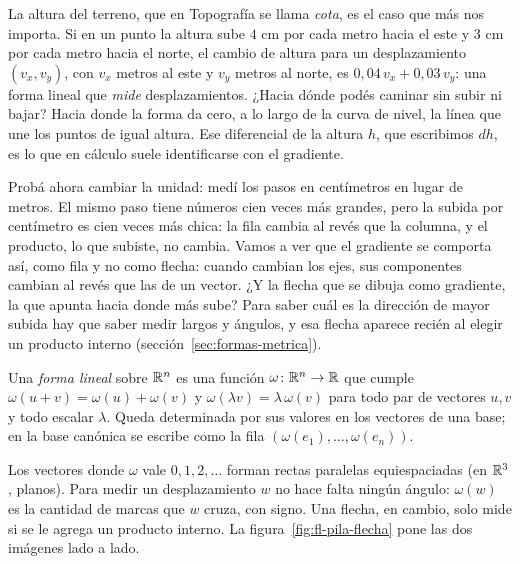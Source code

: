 La altura del terreno, que en Topografía se llama \emph{cota}, es el caso que más nos importa.
Si en un punto la altura sube \(4\) cm por cada metro hacia el este y \(3\) cm por cada metro
hacia el norte, el cambio de altura para un desplazamiento \((v_x,v_y)\), con \(v_x\) metros
al este y \(v_y\) metros al norte, es \(0{,}04\,v_x+0{,}03\,v_y\): una forma lineal que
\emph{mide} desplazamientos. ¿Hacia dónde podés caminar sin subir ni bajar? Hacia donde la
forma da cero, a lo largo de la curva de nivel, la línea que une los puntos de igual altura. Ese diferencial de la altura \(h\), que
escribimos \(dh\), es lo que en cálculo suele identificarse con el gradiente.

Probá ahora cambiar la unidad: medí los pasos en centímetros en lugar de metros. El mismo paso
tiene números cien veces más grandes, pero la subida por centímetro es cien veces más chica:
la fila cambia al revés que la columna, y el producto, lo que subiste, no cambia. Vamos a ver
que el gradiente se comporta así, como fila y no como flecha: cuando cambian los ejes, sus
componentes cambian al revés que las de un vector. ¿Y la flecha que se dibuja como gradiente,
la que apunta hacia donde más sube? Para saber cuál es la dirección de mayor subida hay que
saber medir largos y ángulos, y esa flecha aparece recién al elegir un producto interno
(sección~\ref{sec:formas-metrica}).

\begin{definicion}\label{def:forma-lineal}
Una \emph{forma lineal} sobre \(\mathbb{R}^n\) es una función \(\omega\colon\mathbb{R}^n\to\mathbb{R}\) que cumple
\(\omega(u+v)=\omega(u)+\omega(v)\) y \(\omega(\lambda v)=\lambda\,\omega(v)\) para todo par
de vectores \(u,v\) y todo escalar \(\lambda\). Queda determinada por sus valores en los
vectores de una base; en la base canónica se escribe como la fila
\((\omega(e_1),\ldots,\omega(e_n))\).
\end{definicion}

\begin{idea}
Los vectores donde \(\omega\) vale \(0,1,2,\ldots\) forman rectas paralelas equiespaciadas
(en \(\mathbb{R}^3\), planos). Para medir un desplazamiento \(w\) no hace falta ningún ángulo:
\(\omega(w)\) es la cantidad de marcas que \(w\) cruza, con signo. Una flecha, en cambio, solo
mide si se le agrega un producto interno. La figura~\ref{fig:fl-pila-flecha} pone las dos
imágenes lado a lado.
\end{idea}

